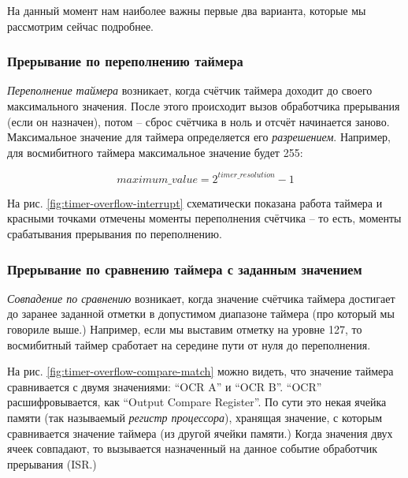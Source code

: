 \documentclass[../sparc.tex]{subfiles}
\begin{document}
На данный момент нам наиболее важны первые два варианта, которые мы рассмотрим
сейчас подробнее.

\subsubsection{Прерывание по переполнению таймера}


\emph{Переполнение таймера} возникает, когда счётчик таймера доходит до своего
максимального значения.  После этого происходит вызов обработчика прерывания
(если он назначен), потом -- сброс счётчика в ноль и отсчёт начинается заново.
Максимальное значение для таймера определяется его \emph{разрешением}.
Например, для восмибитного таймера максимальное значение будет 255:

\begin{equation}
  maximum\_value = 2^{timer\_resolution} - 1
\end{equation}

На рис. \ref{fig:timer-overflow-interrupt} схематически показана работа таймера
и красными точками отмечены моменты переполнения счётчика -- то есть, моменты
срабатывания прерывания по переполнению.

\subsubsection{Прерывание по сравнению таймера с заданным значением}


\emph{Совпадение по сравнению} возникает, когда значение счётчика таймера
достигает до заранее заданной отметки в допустимом диапазоне таймера (про
который мы говориле выше.)  Например, если мы выставим отметку на уровне 127, то
восмибитный таймер сработает на середине пути от нуля до переполнения.


На рис. \ref{fig:timer-overflow-compare-match} можно видеть, что значение
таймера сравнивается с двумя значениями: ``OCR A'' и ``OCR B''. ``OCR''
расшифровывается, как ``Output Compare Register''.  По сути это некая ячейка
памяти (так называемый \emph{регистр процессора}), хранящая значение, с которым
сравнивается значение таймера (из другой ячейки памяти.)  Когда значения двух
ячеек совпадают, то вызывается назначенный на данное событие обработчик
прерывания (\gls{ISR}.)
\end{document}
